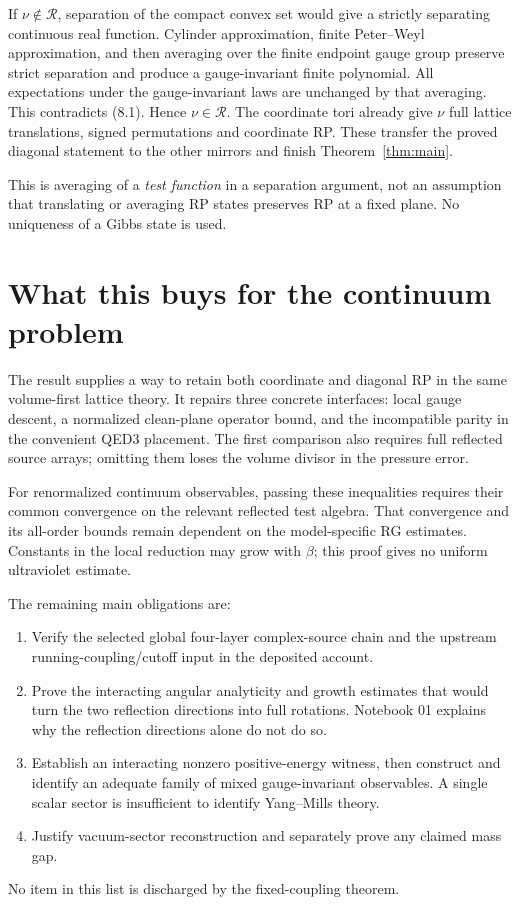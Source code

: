 \documentclass[11pt]{article}
\theoremstyle{remark}
\begin{document}
If $\nu\notin\mathcal R$, separation of the compact convex set
would give a strictly separating continuous real function. Cylinder
approximation, finite Peter--Weyl approximation, and then averaging
over the finite endpoint gauge group preserve strict separation and
produce a gauge-invariant finite polynomial.
All expectations under the gauge-invariant laws are unchanged by
that averaging. This contradicts (8.1). Hence $\nu\in\mathcal R$.
The coordinate tori already give $\nu$ full lattice translations,
signed permutations and coordinate RP. These transfer the proved
diagonal statement to the other mirrors and finish
Theorem~\ref{thm:main}.

This is averaging of a \emph{test function} in a separation argument,
not an assumption that translating or averaging RP states preserves
RP at a fixed plane. No uniqueness of a Gibbs state is used.

\section{What this buys for the continuum problem}

The result supplies a way to retain both coordinate and diagonal RP
in the same volume-first lattice theory. It repairs three concrete
interfaces: local gauge descent, a normalized clean-plane operator
bound, and the incompatible parity in the convenient QED3 placement.
The first comparison also requires full reflected source arrays;
omitting them loses the volume divisor in the pressure error.

For renormalized continuum observables, passing these inequalities
requires their common convergence on the relevant reflected test
algebra. That convergence and its all-order bounds remain dependent
on the model-specific RG estimates. Constants in the local reduction
may grow with $\beta$; this proof gives no uniform ultraviolet estimate.

The remaining main obligations are:
\begin{enumerate}
\item Verify the selected global four-layer complex-source chain and
the upstream running-coupling/cutoff input in the deposited account.
\item Prove the interacting angular analyticity and growth estimates
that would turn the two reflection directions into full rotations.
Notebook 01 explains why the reflection directions alone do not do so.
\item Establish an interacting nonzero positive-energy witness, then
construct and identify an adequate family of mixed gauge-invariant
observables. A single scalar sector is insufficient to identify
Yang--Mills theory.
\item Justify vacuum-sector reconstruction and separately prove any
claimed mass gap.
\end{enumerate}
No item in this list is discharged by the fixed-coupling theorem.
\end{document}
